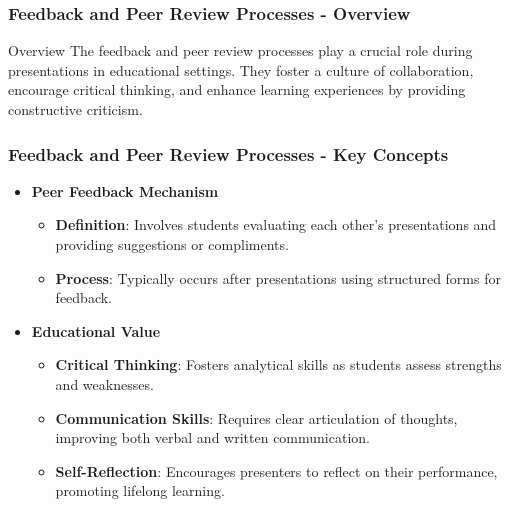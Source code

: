 \documentclass[aspectratio=169]{beamer}
\begin{document}
\begin{frame}[fragile]
    \frametitle{Feedback and Peer Review Processes - Overview}
    \begin{block}{Overview}
        The feedback and peer review processes play a crucial role during presentations in educational settings. 
        They foster a culture of collaboration, encourage critical thinking, and enhance learning experiences by providing constructive criticism.
    \end{block}
\end{frame}

\begin{frame}[fragile]
    \frametitle{Feedback and Peer Review Processes - Key Concepts}
    \begin{itemize}
        \item \textbf{Peer Feedback Mechanism}
        \begin{itemize}
            \item \textbf{Definition}: Involves students evaluating each other's presentations and providing suggestions or compliments.
            \item \textbf{Process}: Typically occurs after presentations using structured forms for feedback.
        \end{itemize}
        
        \item \textbf{Educational Value}
        \begin{itemize}
            \item \textbf{Critical Thinking}: Fosters analytical skills as students assess strengths and weaknesses.
            \item \textbf{Communication Skills}: Requires clear articulation of thoughts, improving both verbal and written communication.
            \item \textbf{Self-Reflection}: Encourages presenters to reflect on their performance, promoting lifelong learning.
        \end{itemize}
    \end{itemize}
\end{frame}
\end{document}
